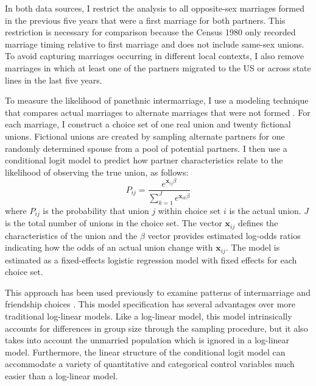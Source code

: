 \documentclass[11pt,]{article}
\begin{document}
In both data sources, I restrict the analysis to all opposite-sex marriages formed in the previous five years that were a first marriage for both partners. This restriction is necessary for comparison because the Census 1980 only recorded marriage timing relative to first marriage and does not include same-sex unions. To avoid capturing marriages occurring in different local contexts, I also remove marriages in which at least one of the partners migrated to the US or across state lines in the last five years.

To measure the likelihood of panethnic intermarriage, I use a modeling technique that compares actual marriages to alternate marriages that were not formed \citep{gullickson_counterfactual_2021}. For each marriage, I construct a choice set of one real union and twenty fictional unions. Fictional unions are created by sampling alternate partners for one randomly determined spouse from a pool of potential partners. I then use a conditional logit model to predict how partner characteristics relate to the likelihood of observing the true union, as follows: \[P_{ij}=\frac{e^{\mathbf{x}_{ij}\beta}}{\sum_{k=1}^J e^{\mathbf{x}_{ik}\beta}}\] where \(P_{ij}\) is the probability that union \(j\) within choice set \(i\) is the actual union. \(J\) is the total number of unions in the choice set. The vector \(\mathbf{x}_{ij}\) defines the characteristics of the union and the \(\beta\) vector provides estimated log-odds ratios indicating how the odds of an actual union change with \(\mathbf{x}_{ij}\). The model is estimated as a fixed-effects logistic regression model with fixed effects for each choice set.

This approach has been used previously to examine patterns of intermarriage \citep{dalmia_empirical_2001, jepsen_empirical_2002, nielsen_educational_2009, qian_marriage_2018} and friendship choices \citep{zeng_preference_2008}. This model specification has several advantages over more traditional log-linear models. Like a log-linear model, this model intrinsically accounts for differences in group size through the sampling procedure, but it also takes into account the unmarried population which is ignored in a log-linear model. Furthermore, the linear structure of the conditional logit model can accommodate a variety of quantitative and categorical control variables much easier than a log-linear model.
\end{document}

